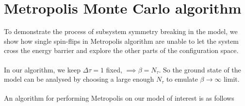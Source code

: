 \documentclass[../thesis_main.tex]{subfiles}
\begin{document}
\section{Metropolis Monte Carlo algorithm}

To demonstrate the process of subsystem symmetry breaking in the model, we show how single spin-flips in Metropolis algorithm are unable to let the system cross the energy barrier and explore the other parts of the configuration space.~\\~\\
In our algorithm, we keep $\Delta \tau = 1$ fixed, $\implies \beta = N_\tau $. So the ground state of the model can be analysed by choosing a large enough $N_\tau $ to emulate $\beta \to \infty$ limit.~\\~\\
An algorithm for performing Metropolis on our model of interest is as follows
\end{document}
